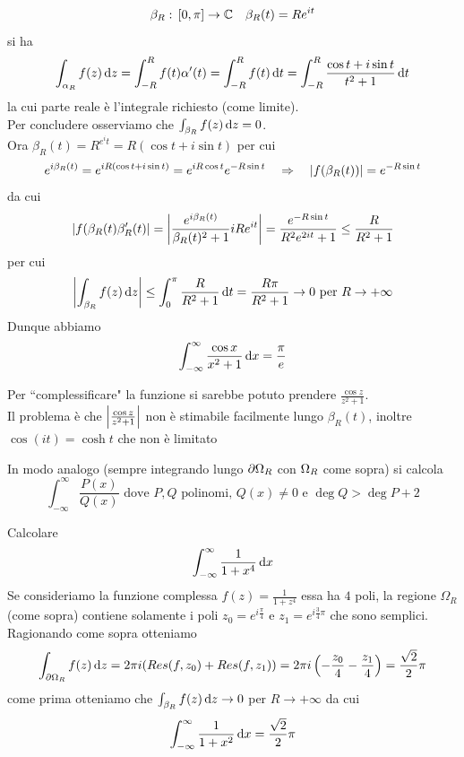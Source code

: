 \begin{ese}
\begin{ese}
$$\beta_R:\, [0, \pi]\to \mathbb{C} \quad \beta_R(t) = R e^{it}$$
si ha 
$$ \int_{\alpha_R} f(z) \, \mathrm{d}z = \int_{-R}^R f(t) \alpha'(t)= \int_{-R}^R f(t) \, \mathrm{d}t = \int_{-R}^R \frac{\cos t + i\sin t}{t^2 +1} \, \mathrm{d}t $$
la cui parte reale \`e l'integrale richiesto (come limite).\\
Per concludere osserviamo che $\int_{\beta_R} f(z) \, \mathrm{d}z = 0$.\\
Ora $\beta_R(t)=R^{e^it}= R(\cos t + i \sin t)$ per cui 
$$e^{i\beta_R(t)} = e^{iR(\cos t+ i \sin t) } = e^{iR \cos t } e^{-R \sin t }\quad \Rightarrow \quad \left\vert f(\beta_R(t)) \right\vert=e^{-R\sin t }$$
da cui 
$$ \left\vert f(\beta_R(t) \beta_R'(t)  \right\vert =\left\vert \frac{e^{i\beta_R(t)}}{\beta_R(t)^2 + 1} i R e^{it} \right\vert=\frac{e^{-R\sin t} }{R^2 e^{2it}+1} \leq \frac{R}{R^2 +1}$$ 
per cui 
$$ \left\vert \int_{\beta_R} f(z) \, \mathrm{d}z  \right\vert \leq \int_0^\pi \frac{R}{R^2 +1} \, \mathrm{d}t  = \frac{R \pi }{R^2 +1} \to 0 \text{ per } R \to +\infty$$
Dunque abbiamo 
$$ \int_{-\infty}^{\infty} \frac{\cos x }{x^2 + 1}\, \mathrm{d}x = \frac{\pi}{e}$$
\end{ese}
\begin{oss}Per ``complessificare" la funzione si sarebbe potuto prendere $\frac{\cos z }{z^2 +1}$.\\
Il problema \`e che $\left\vert \frac{\cos z }{z^2 +1} \right\vert$ non \`e stimabile facilmente lungo $\beta_R(t)$, inoltre $\cos (i t) = \cosh t $ che non \`e limitato
\end{oss}
\begin{oss}In modo analogo (sempre integrando lungo $\partial \Omega_R$ con $\Omega_R$ come sopra) si calcola
$$ \int_{-\infty}^\infty \frac{P(x)}{Q(x)}\text{ dove } P, Q \text{ polinomi, } Q(x)  \neq  0 \text{ e } \deg Q > \deg P+2 $$
\end{oss}
\spazio
\begin{ese}Calcolare
$$ \int_{-\infty}^\infty \frac{1}{1+x^4}\, \mathrm{d}x $$ 
Se consideriamo la funzione complessa $f(z) = \frac{1}{1+z^4}$ essa ha $4$ poli, la  regione $\Omega_R$ (come sopra)  contiene solamente i poli $z_0=e^{i \frac{\pi}{4}}$ e $z_1=e^{i\frac{3}{4}\pi }$ che sono semplici.\\
Ragionando come sopra otteniamo
$$ \int_{\partial\Omega_R} f(z) \, \mathrm{d}z = 2\pi i ( Res(f,z_0) + Res(f,z_1)) =2\pi i \left( -\frac{z_0}{4}- \frac{z_1}{4} \right) =\frac{\sqrt{2}}{2}\pi$$
come prima otteniamo che $\int_{\beta_R} f(z)\, \mathrm{d}z \to 0 $ per $R \to +\infty$ da cui 
$$ \int_{-\infty}^\infty\frac{1}{1+x^2} \, \mathrm{d}x = \frac{\sqrt{2}}{2}\pi $$
\end{ese}








\end{ese}
